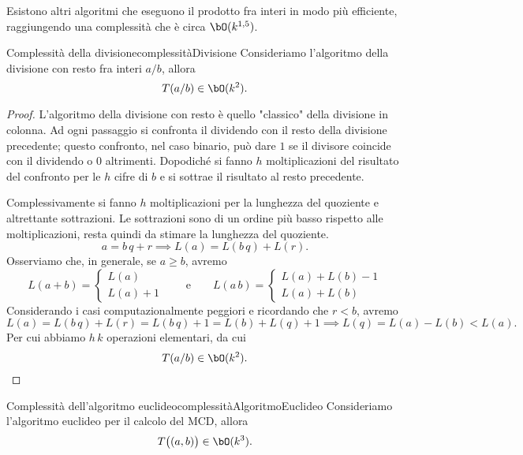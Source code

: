 	\begin{oss}
	Esistono altri algoritmi che eseguono il prodotto fra interi in modo più efficiente, raggiungendo una complessità che è circa \(\bO(k^{1,5})\).
	\end{oss}

	\begin{prop}{Complessità della divisione}{complessitàDivisione}
	Consideriamo l'algoritmo della divisione con resto fra interi \(a/b\), allora
		\[
		T(a/b) \in \bO(k^2).
		\]
	\end{prop}

	\begin{proof}
	L'algoritmo della divisione con resto è quello "classico" della divisione in colonna.
	Ad ogni passaggio si confronta il dividendo con il resto della divisione precedente; questo confronto, nel caso binario, può dare \(1\) se il divisore coincide con il dividendo o \(0\) altrimenti. Dopodiché si fanno \(h\) moltiplicazioni del risultato del confronto per le \(h\) cifre di \(b\) e si sottrae il risultato al resto precedente.

	Complessivamente si fanno \(h\) moltiplicazioni per la lunghezza del quoziente e altrettante sottrazioni. Le sottrazioni sono di un ordine più basso rispetto alle moltiplicazioni, resta quindi da stimare la lunghezza del quoziente.
		\[
		a = b\,q +r \implies L(a) = L(b\,q) + L(r).
		\]
	Osserviamo che, in generale, se \(a\ge b\), avremo
		\[
		L(a+b)  = 	\begin{cases}
					L(a)\\
					L(a)+1
					\end{cases}
		\qquad\text{e}\qquad
		L(a\,b) = 	\begin{cases}
					L(a)+L(b)-1\\
					L(a)+L(b)
					\end{cases}
		\]
	Considerando i casi computazionalmente peggiori e ricordando che \(r<b\), avremo
		\[
		L(a) = L(b\,q)+L(r) = L(b\,q)+1 = L(b)+L(q)+1 \implies L(q) = L(a)-L(b) < L(a).
		\]
	Per cui abbiamo \(h\,k\) operazioni elementari, da cui
		\[
		T(a/b) \in \bO(k^2).\qedhere
		\]
	\end{proof}

	\begin{prop}{Complessità dell'algoritmo euclideo}{complessitàAlgoritmoEuclideo}
	Consideriamo l'algoritmo euclideo per il calcolo del MCD, allora
		\[
		T\big((a,b)\big) \in \bO(k^3).
		\]
	\end{prop}

